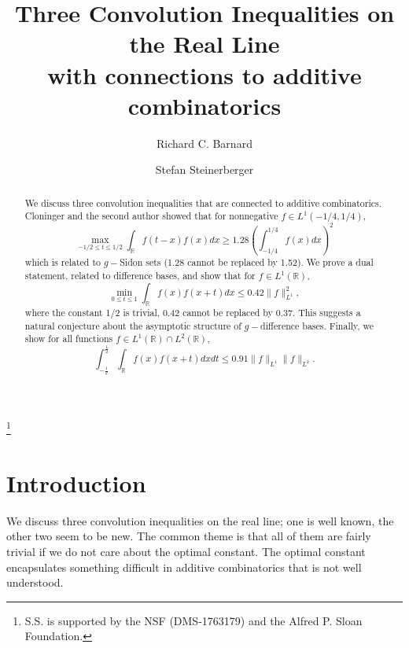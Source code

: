 \documentclass{amsart}
\theoremstyle{remark}
\begin{document}
\title[]{Three Convolution Inequalities on the Real Line\\ with connections to additive combinatorics}
\thanks{S.S. is supported by the NSF (DMS-1763179) and the Alfred P. Sloan Foundation.}

\author[]{Richard C. Barnard}
\address{Department of Mathematics, Western Washington University, Bellingham, WA 98225}

\author[]{Stefan Steinerberger}
\address{Department of Mathematics, Yale University, New Haven, CT 06511}



\begin{abstract} We discuss three convolution inequalities that are connected to additive combinatorics.
Cloninger and the second author showed that for nonnegative $f \in L^1(-1/4, 1/4)$,
$$ \max_{-1/2 \leq t \leq 1/2} \int_{\mathbb{R}}{f(t-x) f(x) dx} \geq 1.28 \left( \int_{-1/4}^{1/4}{f(x) dx}\right)^2$$
which is related to $g-$Sidon sets (1.28 cannot be replaced by 1.52).
 We prove a dual statement, related to difference bases, and show that for $f \in L^1(\mathbb{R})$,
$$ \min_{0 \leq t \leq 1}\int_{\mathbb{R}}{f(x) f(x+t) dx} \leq 0.42 \|f\|_{L^1}^2,$$
where the constant 1/2 is trivial, 0.42 cannot be replaced by 0.37. This suggests a natural conjecture about the asymptotic structure of $g-$difference bases. Finally, we show for all functions $f \in L^1(\mathbb{R}) \cap L^2(\mathbb{R})$,
$$ \int_{-\frac{1}{2}}^{\frac{1}{2}}{ \int_{\mathbb{R}}{f(x) f(x+t) dx}dt} \leq 0.91 \|f\|_{L^1}\|f\|_{L^2}.$$
\end{abstract}

\maketitle

\vspace{-25pt}

\section{Introduction}

We discuss three convolution inequalities on the real line; one is well known, the other two seem to be new. The common theme is that all of them are fairly trivial if we do not care about the optimal constant. The optimal constant encapsulates something difficult in additive combinatorics that is not well understood.
\end{document}
